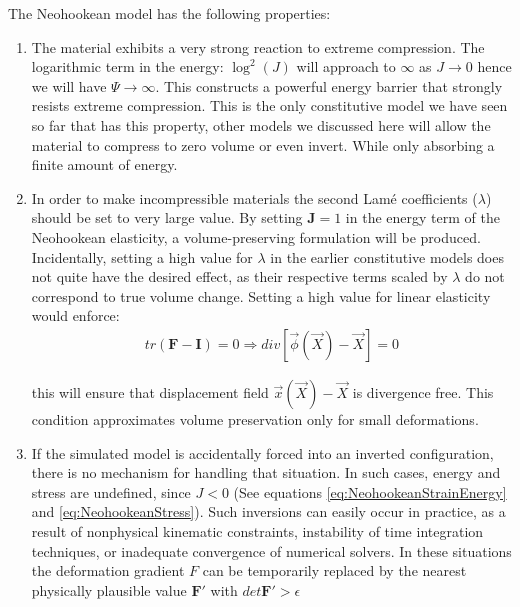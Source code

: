 The Neohookean model has the following properties:

\begin{enumerate}
 \item The material exhibits a very strong reaction to extreme compression. The logarithmic term in the energy: $\log^2(J)$ will approach 
 to $\infty$ as $J \rightarrow 0$ hence we will have $\Psi \rightarrow \infty$. This constructs a powerful energy barrier that strongly
 resists extreme compression. This is the only constitutive model we have seen so far that has this property, other models we discussed here
 will allow the material to compress to zero volume or even invert. While only absorbing a finite amount of energy.
 
 \item In order to make incompressible materials the second Lam\'e coefficients ($\lambda$) should be set to very large value. By setting 
 $\boldsymbol{J}=1$ in the energy term of the Neohookean elasticity, a volume-preserving formulation will be produced. Incidentally, setting a
 high value for $\lambda$ in the earlier constitutive models does not quite have the desired effect, as their respective terms scaled by $\lambda$
 do not correspond to true volume change. Setting a high value for linear elasticity would enforce:
\begin{gather*}
  tr(\boldsymbol{F}-\boldsymbol{I})=0 \Rightarrow div\left[\vec{\phi}(\vec{X})-\vec{X}\right] = 0
\end{gather*}

this will ensure that displacement field $\vec{x}(\vec{X})-\vec{X}$ is divergence free. This condition approximates volume preservation only
for small deformations.

\item If the simulated model is accidentally forced into an inverted configuration, there is no mechanism for handling that situation.  
In such cases, energy and stress are undefined, since $J <0$ (See equations \ref{eq:NeohookeanStrainEnergy} and \ref{eq:NeohookeanStress}).
Such inversions can easily occur in practice, as a result of nonphysical kinematic constraints, instability of time integration techniques,
or inadequate convergence of numerical solvers. In these situations the deformation gradient $F$ can be temporarily replaced by the nearest
physically plausible value $\boldsymbol{F'}$ with $det\boldsymbol{F'} > \epsilon$
\end{enumerate}

\setlength{\unitlength}{\savedunitlength}

